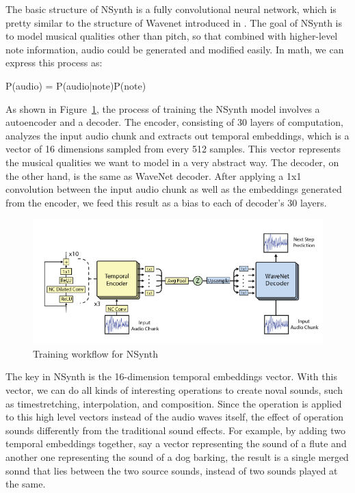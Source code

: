\documentclass[jou]{apa6}
\begin{document}
The basic structure of NSynth is a fully convolutional neural network, which is pretty similar to the structure of Wavenet introduced in \textcite{oord2016wavenet}. The goal of NSynth is to model musical qualities other than pitch, so that combined with higher-level note information, audio could be generated and modified easily. In math, we can express this process as:

\centerline{P(audio) = P(audio|note)P(note)}

As shown in Figure~\ref{fig:Figure2}, the process of training the NSynth model involves a autoencoder and a decoder. The encoder, consisting of 30 layers of computation, analyzes the input audio chunk and extracts out temporal embeddings, which is a vector of 16 dimensions sampled from every 512 samples. This vector represents the musical qualities we want to model in a very abstract way. The decoder, on the other hand, is the same as WaveNet decoder. After applying a 1x1 convolution between the input audio chunk as well as the embeddings generated from the encoder, we feed this result as a bias to each of decoder's 30 layers.

\begin{figure}[h!]
    \includegraphics[width=\linewidth]{nsynth.png}
    \caption{Training workflow for NSynth}
    \label{fig:Figure2}
\end{figure}

The key in NSynth is the 16-dimension temporal embeddings vector. With this vector, we can do all kinds of interesting operations to create noval sounds, such as timestretching, interpolation, and composition. Since the operation is applied to this high level vectors instead of the audio waves itself, the effect of operation sounds differently from the traditional sound effects. For example, by adding two temporal embeddings together, say a vector representing the sound of a flute and another one representing the sound of a dog barking, the result is a single merged sonnd that lies between the two source sounds, instead of two sounds played at the same.
\end{document}

